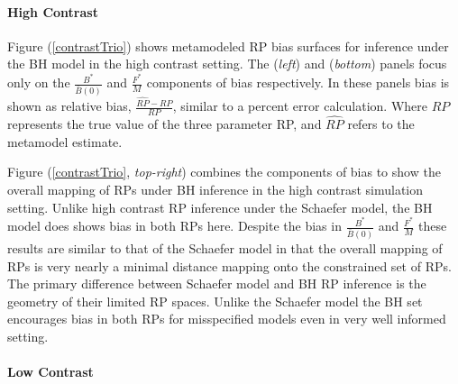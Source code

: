 %
\paragraph{High Contrast}

%
Figure (\ref{contrastTrio}) shows metamodeled RP bias surfaces for inference 
under the BH model in the high contrast setting. The (\emph{left}) and 
(\emph{bottom}) panels focus only on the $\frac{B^*}{\bar B(0)}$ and 
$\frac{F^*}{M}$ components of bias respectively. In these panels bias is shown
as relative bias, $\frac{\widehat{RP}-RP}{RP}$, similar to a percent error calculation.
Where $RP$ represents the true value of the three parameter RP, and $\widehat{RP}$ 
refers to the metamodel estimate.

%
Figure (\ref{contrastTrio}, \emph{top-right}) combines the components of bias to 
show the overall mapping of RPs under BH inference in the high contrast 
simulation setting. Unlike high contrast RP inference under the Schaefer model, 
the BH model does shows bias in both RPs here. Despite the bias in 
$\frac{B^*}{\bar B(0)}$ and $\frac{F^*}{M}$ these results are similar to 
that of the Schaefer model in that the overall mapping of RPs is very nearly a 
minimal distance mapping onto the constrained set of RPs. %
The primary difference between Schaefer model and BH RP inference is the geometry of 
their limited RP spaces. Unlike the Schaefer model the BH set encourages
bias in both RPs for misspecified models even in very well informed setting.

%
%
%


\paragraph{Low Contrast}

